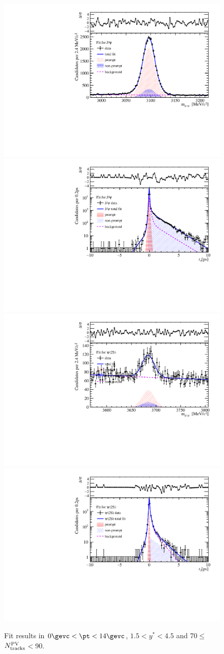 \begin{figure}[H]
\begin{center}
\includegraphics[width=0.45\linewidth]{pdf/pPb/Workdir/TwoDimFit/ProjMass/Jpsi_n3y1pt1.pdf}
\includegraphics[width=0.45\linewidth]{pdf/pPb/Workdir/TwoDimFit/ProjTz/Jpsi_n3y1pt1.pdf}
\vspace*{-0.5cm}
\includegraphics[width=0.45\linewidth]{pdf/pPb/Workdir/TwoDimFit/ProjMass/Psi2S_n3y1pt1.pdf}
\includegraphics[width=0.45\linewidth]{pdf/pPb/Workdir/TwoDimFit/ProjTz/Psi2S_n3y1pt1.pdf}
\vspace*{-0.5cm}
\end{center}
\caption{Fit results in $0\gevc<\pt<14\gevc$, $1.5<y^*<4.5$ and 70$\leq$$N_{\rm tracks}^{\rm PV}$$<$90.}
\end{figure}

